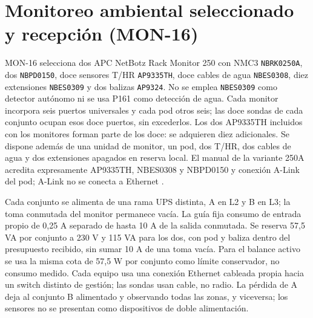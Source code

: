 \section{Monitoreo ambiental seleccionado y recepción (MON-16)}
\label{sec:sd4-monitoreo-mon16}

MON-16 selecciona dos APC NetBotz Rack Monitor 250 con NMC3 \texttt{NBRK0250A}, dos \texttt{NBPD0150}, doce sensores T/HR \texttt{AP9335TH}, doce cables de agua \texttt{NBES0308}, diez extensiones \texttt{NBES0309} y dos balizas \texttt{AP9324}. No se emplea \texttt{NBES0309} como detector autónomo ni se usa P161 como detección de agua. Cada monitor incorpora seis puertos universales y cada pod otros seis; las doce sondas de cada conjunto ocupan esos doce puertos, sin excederlos. Los dos AP9335TH incluidos con los monitores forman parte de los doce: se adquieren diez adicionales. Se dispone además de una unidad de monitor, un pod, dos T/HR, dos cables de agua y dos extensiones apagados en reserva local. El manual de la variante 250A acredita expresamente AP9335TH, NBES0308 y NBPD0150 y conexión A-Link del pod; A-Link no se conecta a Ethernet \parencites[pp.~24--26]{lote16-netbotz-guia}{lote16-netbotz-instalacion}{lote16-netbotz-pod}{lote16-netbotz-agua}.

Cada conjunto se alimenta de una rama UPS distinta, A en L2 y B en L3; la toma conmutada del monitor permanece vacía. La guía fija consumo de entrada propio de 0,25 A separado de hasta 10 A de la salida conmutada. Se reserva 57,5 VA por conjunto a 230 V y 115 VA para los dos, con pod y baliza dentro del presupuesto recibido, sin sumar 10 A de una toma vacía. Para el balance activo se usa la misma cota de 57,5 W por conjunto como límite conservador, no consumo medido. Cada equipo usa una conexión Ethernet cableada propia hacia un switch distinto de gestión; las sondas usan cable, no radio. La pérdida de A deja al conjunto B alimentado y observando todas las zonas, y viceversa; los sensores no se presentan como dispositivos de doble alimentación.

